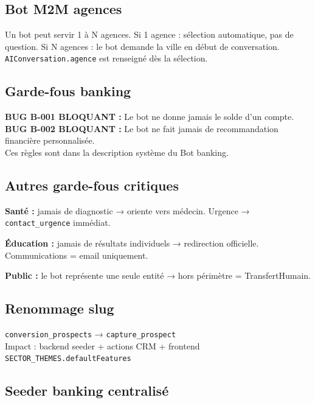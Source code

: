 \documentclass[11pt,a4paper]{article}
\newcommand{\slug}[1]{\texttt{\color{AGTDark}#1}}
\begin{document}
\subsection{Bot M2M agences}

\begin{notebox}
Un bot peut servir 1 à N agences. Si 1 agence : sélection automatique, pas de question.
Si N agences : le bot demande la ville en début de conversation.
\slug{AIConversation.agence} est renseigné dès la sélection.
\end{notebox}

\subsection{Garde-fous banking}

\begin{warnbox}
\textbf{BUG B-001 BLOQUANT :} Le bot ne donne jamais le solde d'un compte.\\
\textbf{BUG B-002 BLOQUANT :} Le bot ne fait jamais de recommandation financière personnalisée.\\
Ces règles sont dans la description système du Bot banking.
\end{warnbox}

\subsection{Autres garde-fous critiques}

\textbf{Santé :} jamais de diagnostic → oriente vers médecin. Urgence → \slug{contact\_urgence} immédiat.

\textbf{Éducation :} jamais de résultats individuels → redirection officielle. Communications = email uniquement.

\textbf{Public :} le bot représente une seule entité → hors périmètre = TransfertHumain.

\subsection{Renommage slug}

\begin{decisionbox}
\slug{conversion\_prospects} → \slug{capture\_prospect}\\
Impact : backend seeder + actions CRM + frontend \slug{SECTOR\_THEMES.defaultFeatures}
\end{decisionbox}

\subsection{Seeder banking centralisé}
\end{document}
